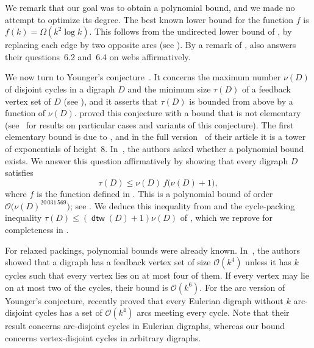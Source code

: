 \documentclass[fontsize=12pt,leading=14pt]{fullpaper}
\DeclareMathOperator{\dtw}{\mathsf{dtw}}
\begin{document}
We remark that our goal was to obtain a polynomial bound, and we made no attempt to optimize its degree.
The best known lower bound for the function $f$ is $f(k)=\Omega(k^2\log k)$.
This follows from the undirected lower bound of \textcite{RST94}, by replacing each edge by two opposite arcs (see ).
By a remark of \textcite[Section~6]{HKMM26b},  also answers their questions~6.2 and~6.4 on webs affirmatively.

We now turn to Younger's conjecture~\cite{Younger73}.
It concerns the maximum number $\nu(D)$ of disjoint cycles in a digraph $D$ and the minimum size $\tau(D)$ of a feedback vertex set of $D$ (see ), and it asserts that $\tau(D)$ is bounded from above by a function of $\nu(D)$.
\textcite{ReedRST96} proved this conjecture with a bound that is not elementary (see~\cite{McCuaig93,ReedS96,GoemansW98,GueninT11,SchlombergTV25,BessyBKSSTZ21,AKKW16,Seymour95,LucchesiY78,Seymour96} for results on particular cases and variants of this conjecture).
The first elementary bound is due to \textcite{HKMM24}, and in the full version~\cite{HKMM26a} of their article it is a tower of exponentials of height~$8$. In~\cite[Question~10.1]{HKMM26a}, the authors asked whether a polynomial bound exists. We answer this question affirmatively by showing that every digraph $D$ satisfies
\[
  \tau(D)\le\nu(D)\,f\bigl(\nu(D)+1\bigr),
\]
where $f$ is the function defined in . This is a polynomial bound of order $\mathcal{O}\bigl(\nu(D)^{20\,031\,569}\bigr)$; see .
We deduce this inequality from  and the cycle-packing inequality $\tau(D)\le(\dtw(D)+1)\nu(D)$ of \textcite[conference version, Lemma~3]{MMPRS22}, which we reprove for completeness in .

For relaxed packings, polynomial bounds were already known.
In~\cite[Theorem~1]{MMPRS22}, the authors showed that a digraph has a feedback vertex set of size $\mathcal{O}(k^4)$ unless it has $k$ cycles such that every vertex lies on at most four of them.
If every vertex may lie on at most two of the cycles, their bound is $\mathcal{O}(k^6)$.
For the arc version of Younger's conjecture, \textcite[Theorem~1]{GSS26} recently proved that every Eulerian digraph without $k$ arc-disjoint cycles has a set of $\mathcal{O}(k^4)$ arcs meeting every cycle.
Note that their result concerns arc-disjoint cycles in Eulerian digraphs, whereas our bound concerns vertex-disjoint cycles in arbitrary digraphs.
\end{document}
